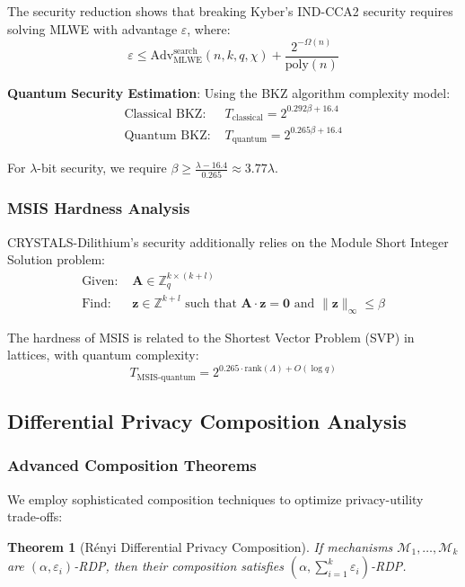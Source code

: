 \documentclass[journal,onecolumn]{IEEEtran}
\newtheorem{theorem}{Theorem}
\begin{document}
The security reduction shows that breaking Kyber's IND-CCA2 security requires solving MLWE with advantage $\varepsilon$, where:
$$\varepsilon \leq \text{Adv}_{\text{MLWE}}^{\text{search}}(n, k, q, \chi) + \frac{2^{-\Omega(n)}}{\text{poly}(n)}$$

\textbf{Quantum Security Estimation}: Using the BKZ algorithm complexity model:
\begin{align}
\text{Classical BKZ: } &T_{\text{classical}} = 2^{0.292 \beta + 16.4} \\
\text{Quantum BKZ: } &T_{\text{quantum}} = 2^{0.265 \beta + 16.4}
\end{align}

For $\lambda$-bit security, we require $\beta \geq \frac{\lambda - 16.4}{0.265} \approx 3.77\lambda$.

\subsubsection{MSIS Hardness Analysis}

CRYSTALS-Dilithium's security additionally relies on the Module Short Integer Solution problem:
\begin{align}
\text{Given: } &\mathbf{A} \in \mathbb{Z}_q^{k \times (k+l)} \\
\text{Find: } &\mathbf{z} \in \mathbb{Z}^{k+l} \text{ such that } \mathbf{A} \cdot \mathbf{z} = \mathbf{0} \text{ and } \|\mathbf{z}\|_\infty \leq \beta
\end{align}

The hardness of MSIS is related to the Shortest Vector Problem (SVP) in lattices, with quantum complexity:
$$T_{\text{MSIS-quantum}} = 2^{0.265 \cdot \text{rank}(\Lambda) + O(\log q)}$$

\subsection{Differential Privacy Composition Analysis}

\subsubsection{Advanced Composition Theorems}

We employ sophisticated composition techniques to optimize privacy-utility trade-offs:

\begin{theorem}[Rényi Differential Privacy Composition]
If mechanisms $\mathcal{M}_1, \ldots, \mathcal{M}_k$ are $(\alpha, \varepsilon_i)$-RDP, then their composition satisfies $(\alpha, \sum_{i=1}^k \varepsilon_i)$-RDP.
\end{theorem}
\end{document}
